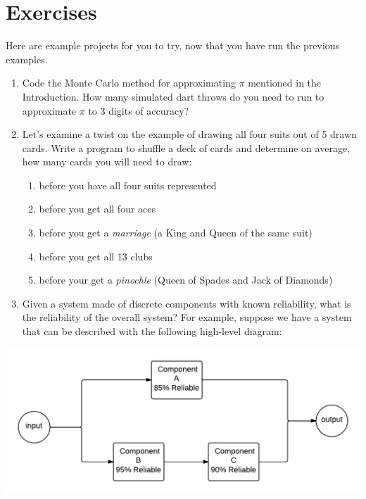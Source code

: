 \documentclass[letterpaper,10pt,openany,oneside]{sphinxmanual}
\begin{document}
\chapter{Exercises}
\label{NextSteps/Exercises:exercises}\label{NextSteps/Exercises::doc}
Here are example projects for you to try, now that you have run the previous examples.
\begin{enumerate}
\item {} 
Code the Monte Carlo method for approximating $\pi$ mentioned in the Introduction.  How many simulated dart throws do you need to run to approximate $\pi$ to 3 digits of accuracy?

\item {} 
Let's examine a twist on the example of drawing all four suits out of 5 drawn cards.  Write a program to shuffle a deck of cards and determine on average, how many cards you will need to draw:
\begin{enumerate}
\item {} 
before you have all four suits represented

\item {} 
before you get all four aces

\item {} 
before you get a \emph{marriage} (a King and Queen of the same suit)

\item {} 
before you get all 13 clubs

\item {} 
before your get a \emph{pinochle} (Queen of Spades and Jack of Diamonds)

\end{enumerate}

\item {} 
Given a system made of discrete components with known reliability, what is the reliability of the overall system? For example, suppose we have a system that can be described with the following high-level diagram:

\end{enumerate}

\includegraphics{StateDiagram.png}
\end{document}

